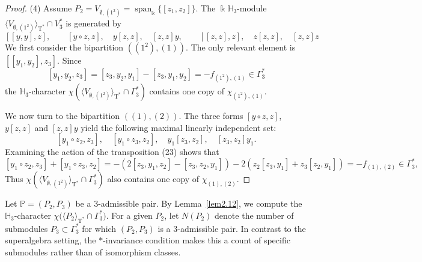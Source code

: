 \documentclass{amsart}
\theoremstyle{definition}
\theoremstyle{remark}
\numberwithin{equation}{section}
\newcommand{\lr}[1]{\langle #1 \rangle}
\def \Ga{\Gamma}
\def \k{\Bbbk}
\def \H{\mathbb{H}}
\def \P{\mathbb{P}}
\def \sp{\operatorname{span}}
\def \T{\operatorname{T}}
\def \es{\emptyset}
\begin{document}
\begin{proof}
	(4) Assume $P_2 = V_{\es, (1^2)} = \sp_\k \{ [z_1,z_2] \}$. The $\k\H_3$-module $\lr{V_{\es, (1^2)}}_{\T^*} \cap V_3^*$ is generated by
	\[
	[[y,y],z],\qquad [y\circ z,z],\quad y[z,z],\quad [z,z]y,\qquad [[z,z],z],\quad z[z,z],\quad [z,z]z
	\]
	We first consider the bipartition $((1^2), (1))$. The only relevant element is $[[y_1,y_2],z_3]$. Since
	\[
	[y_1,y_2,z_3]=[z_3,y_2,y_1]-[z_3,y_1,y_2] = -f_{(1^2),(1)} \in \Ga_3^*
	\]
	the $\H_3$-character $\chi(\lr{V_{\es, (1^2)}}_{\T^*} \cap \Ga_3^*)$ contains one copy of $\chi_{(1^2),(1)}$.
	
	We now turn to the bipartition $((1), (2))$. The three forms $[y\circ z,z]$, $y[z,z]$ and $[z,z]y$ yield the following maximal linearly independent set:
	\[
	[y_1\circ z_2,z_3], \quad [y_1\circ z_3,z_2], \quad y_1[z_3,z_2], \quad [z_3,z_2]y_1.
	\]
	Examining the action of the transposition (23) shows that
	\[
	[y_1\circ z_2,z_3]+[y_1\circ z_3,z_2]=-(2[z_3,y_1,z_2]-[z_3,z_2,y_1])-2(z_2[z_3,y_1]+z_3[z_2,y_1]) = -f_{(1),(2)} \in \Ga_3^*,
	\]
	Thus $\chi(\lr{V_{\es, (1^2)}}_{\T^*} \cap \Ga_3^*)$ also  contains one copy of $\chi_{(1),(2)}$.
\end{proof}	
	
	Let $\P=(P_2, P_3)$ be a $3$-admissible pair. By Lemma~\ref{lem2.12}, we compute the $\H_3$-character $\chi\bigl( \langle P_2 \rangle_{\T^*} \cap \Ga_3^* \bigr)$. For a given $P_2$, let $N(P_2)$ denote the number of submodules $P_3 \subset \Ga_3^*$ for which $(P_2, P_3)$ is a $3$-admissible pair. In contrast to the superalgebra setting, the $*$-invariance condition makes this a count of specific submodules rather than of isomorphism classes.
	
\end{document}
